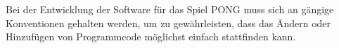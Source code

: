 Bei der Entwicklung der Software für das Spiel PONG \gls{muss} sich an gängige Konventionen gehalten werden, um zu gewährleisten, dass das Ändern oder Hinzufügen von Programmcode möglichst einfach stattfinden kann. 
